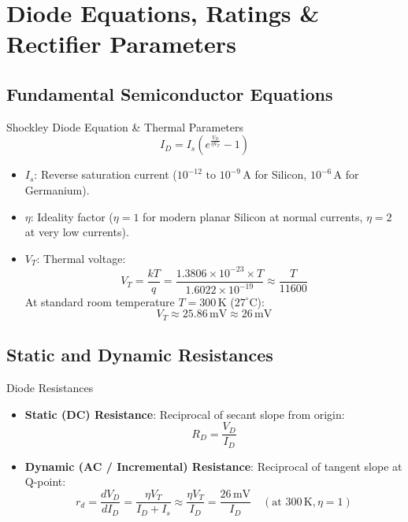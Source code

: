 \chapter{Diode Equations, Ratings \& Rectifier Parameters}

\section{Fundamental Semiconductor Equations}
\begin{formulabox}{Shockley Diode Equation \& Thermal Parameters}
\[ I_D = I_s \left( e^{\frac{V_D}{\eta V_T}} - 1 \right) \]
\begin{itemize}
    \item $I_s$: Reverse saturation current ($10^{-12}\text{ to } 10^{-9}\,\mathrm{A}$ for Silicon, $10^{-6}\,\mathrm{A}$ for Germanium).
    \item $\eta$: Ideality factor ($\eta = 1$ for modern planar Silicon at normal currents, $\eta = 2$ at very low currents).
    \item $V_T$: Thermal voltage:
    \[ V_T = \frac{k T}{q} = \frac{1.3806 \times 10^{-23} \times T}{1.6022 \times 10^{-19}} \approx \frac{T}{11600} \]
    At standard room temperature $T = 300\,\mathrm{K}$ ($27^\circ\mathrm{C}$):
    \[ V_T \approx 25.86\,\mathrm{mV} \approx 26\,\mathrm{mV} \]
\end{itemize}
\end{formulabox}

\section{Static and Dynamic Resistances}
\begin{formulabox}{Diode Resistances}
\begin{itemize}
    \item \textbf{Static (DC) Resistance}: Reciprocal of secant slope from origin:
    \[ R_D = \frac{V_D}{I_D} \]
    \item \textbf{Dynamic (AC / Incremental) Resistance}: Reciprocal of tangent slope at Q-point:
    \[ r_d = \frac{d V_D}{d I_D} = \frac{\eta V_T}{I_D + I_s} \approx \frac{\eta V_T}{I_D} = \frac{26\,\mathrm{mV}}{I_D} \quad (\text{at } 300\,\mathrm{K}, \eta=1) \]
\end{itemize}
\end{formulabox}

